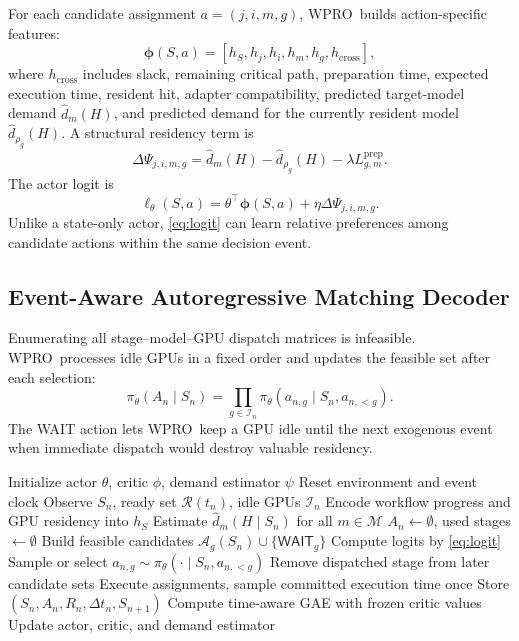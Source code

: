 \documentclass[10pt,conference]{IEEEtran}
\newcommand{\WPRO}{\textsc{WPRO}}
\newcommand{\calI}{\mathcal{I}}
\newcommand{\calM}{\mathcal{M}}
\newcommand{\calA}{\mathcal{A}}
\newcommand{\calR}{\mathcal{R}}
\newcommand{\phia}{\boldsymbol{\phi}}
\begin{document}
For each candidate assignment \(a=(j,i,m,g)\), \WPRO\ builds action-specific features:
\begin{equation}
\phia(S,a)=
[h_S,h_j,h_i,h_m,h_g,h_{\mathrm{cross}}],
\end{equation}
where \(h_{\mathrm{cross}}\) includes slack, remaining critical path, preparation time, expected execution time, resident hit, adapter compatibility, predicted target-model demand \(\hat d_m(H)\), and predicted demand for the currently resident model \(\hat d_{\rho_g}(H)\). A structural residency term is
\begin{equation}
\Delta\Psi_{j,i,m,g}=
\hat d_m(H)-\hat d_{\rho_g}(H)-\lambda L_{g,m}^{\mathrm{prep}}.
\end{equation}
The actor logit is
\begin{equation}
\ell_{\theta}(S,a)=\theta^\top\phia(S,a)+\eta\Delta\Psi_{j,i,m,g}.
\label{eq:logit}
\end{equation}
Unlike a state-only actor, \eqref{eq:logit} can learn relative preferences among candidate actions within the same decision event.

\subsection{Event-Aware Autoregressive Matching Decoder}

Enumerating all stage--model--GPU dispatch matrices is infeasible. \WPRO\ processes idle GPUs in a fixed order and updates the feasible set after each selection:
\begin{equation}
\pi_{\theta}(A_n\mid S_n)=
\prod_{g\in\calI_n}
\pi_{\theta}(a_{n,g}\mid S_n,a_{n,<g}).
\end{equation}
The WAIT action lets \WPRO\ keep a GPU idle until the next exogenous event when immediate dispatch would destroy valuable residency.

\begin{algorithm}[t]
\caption{\WPRO\ Event-Driven Orchestration}
\label{alg:wpro}
\begin{algorithmic}[1]
\State Initialize actor \(\theta\), critic \(\phi\), demand estimator \(\psi\)
    \State Reset environment and event clock
        \State Observe \(S_n\), ready set \(\calR(t_n)\), idle GPUs \(\calI_n\)
        \State Encode workflow progress and GPU residency into \(h_S\)
        \State Estimate \(\hat d_m(H\mid S_n)\) for all \(m\in\calM\)
        \State \(A_n\gets\emptyset\), used stages \(\gets\emptyset\)
        \For{idle GPU \(g\in\calI_n\)}
            \State Build feasible candidates \(\calA_g(S_n)\cup\{\textsf{WAIT}_g\}\)
            \State Compute logits by \eqref{eq:logit}
            \State Sample or select \(a_{n,g}\sim\pi_\theta(\cdot\mid S_n,a_{n,<g})\)
            \State Remove dispatched stage from later candidate sets
        \EndFor
        \State Execute assignments, sample committed execution time once
        \State Store \((S_n,A_n,R_n,\Delta t_n,S_{n+1})\)
    \EndWhile
    \State Compute time-aware GAE with frozen critic values
    \State Update actor, critic, and demand estimator
\EndFor
\end{algorithmic}
\end{algorithm}
\end{document}
